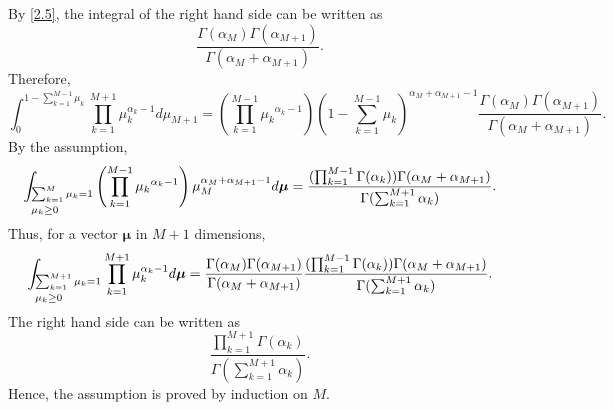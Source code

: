 %
By \ref{2.5}, the integral of the right hand side can be written as
%
\begin{equation}
\frac
{\Gamma(\alpha_M) \Gamma(\alpha_{M + 1})}
{\Gamma(\alpha_M + \alpha_{M + 1})}.
\end{equation}
%
Therefore,
%
\begin{equation}
\int_{0}^{1 - \sum_{k = 1}^{M - 1} \mu_k}
\prod_{k = 1}^{M + 1} 
\mu_k ^ {\alpha_k - 1} 
d\mu_{M + 1}
=
\left( 
	\prod_{k = 1}^{M - 1} 
	{\mu_k} ^ {\alpha_k - 1} 
\right)
\left(
	1
	-
	\sum_{k = 1}^{M - 1} 
	\mu_k
\right) ^ {\alpha_M + \alpha_{M + 1} - 1}
\frac
{\Gamma(\alpha_M) \Gamma(\alpha_{M + 1})}
{\Gamma(\alpha_M + \alpha_{M + 1})}.
\end{equation}
%
By the assumption,
%
\[
\int_
{
\begin{subarray}{l}
\sum_{k = 1}^{M} 
\mu_k 
= 
1 
\\
\\
\mu_k 
\geq 
0
\end{subarray}
}
\left( 
	\prod_{k = 1}^{M - 1} 
	{\mu_k} ^ {\alpha_k - 1} 
\right)
\mu_M ^ {\alpha_M + \alpha_{M + 1} - 1}
d\bm{\mu}
=
\frac
{(\prod_{k = 1}^{M - 1} \Gamma(\alpha_k)) \Gamma(\alpha_M + \alpha_{M + 1})}
{\Gamma(\sum_{k = 1}^{M + 1} \alpha_k)}.
\]
%
Thus, for a vector $\bm{\mu}$ in $M + 1$ dimensions,
%
\[ 
\int_{
\begin{subarray}{l}
\sum_{k = 1}^{M + 1} 
\mu_k 
= 
1 
\\
\\
\mu_k 
\geq 
0
\end{subarray}
}
\prod_{k = 1}^{M + 1} 
\mu_k ^ {\alpha_k - 1} 
d\bm{\mu} 
= 
\frac
{\Gamma(\alpha_M) \Gamma(\alpha_{M + 1})}
{\Gamma(\alpha_M + \alpha_{M + 1})}
\frac
{(\prod_{k = 1}^{M - 1} \Gamma(\alpha_k)) \Gamma(\alpha_M + \alpha_{M + 1})}
{\Gamma(\sum_{k = 1}^{M + 1} \alpha_k)}.
\]
%
The right hand side can be written as
%
\begin{equation}
\frac
{\prod_{k = 1}^{M + 1} \Gamma(\alpha_k)}
{\Gamma(\sum_{k = 1}^{M + 1} \alpha_k)}.
\end{equation}
%
Hence, the assumption is proved by induction on $M$.


